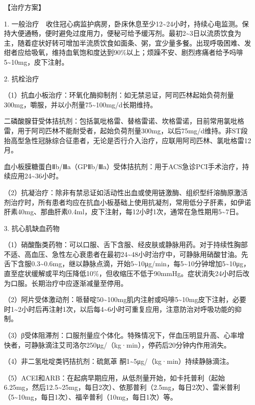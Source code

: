 【治疗方案】

1.
一般治疗　收住冠心病监护病房，卧床休息至少12\textasciitilde{}24小时，持续心电监测。保持大便通畅，便时避免过度用力，便秘可给予缓泻剂。最初2\textasciitilde{}3日以流质饮食为主，随着症状好转可增加半流质饮食如面条、粥，宜少量多餐。出现呼吸困难、发绀者应给吸氧，维持血氧饱和度达到90\%以上；烦躁不安、剧烈疼痛者给予吗啡5\textasciitilde{}10mg，皮下注射。

2. 抗栓治疗

（1）抗血小板治疗：环氧化酶抑制剂：如无禁忌证，阿司匹林起始负荷剂量300mg，嚼服，并以小剂量75\textasciitilde{}100mg/d长期维持。

二磷酸腺苷受体拮抗剂：包括氯吡格雷、替格雷诺、坎格雷诺，目前常用氯吡格雷，用于阿司匹林不能耐受者，起始负荷剂量300mg，以后75mg/d维持。非ST段抬高型急性冠脉综合征患者，无论是否行介入治疗，应联用阿司匹林、氯吡格雷12月。

血小板膜糖蛋白Ⅱb/Ⅲa（GPⅡb/Ⅲa）受体拮抗剂：用于ACS急诊PCI手术治疗，持续应用24\textasciitilde{}36小时。

（2）抗凝治疗：除非有禁忌证如活动性出血或使用链激酶、组织型纤溶酶原激活剂治疗时，所有患者均应在抗血小板基础上使用抗凝剂，常用低分子肝素，如伊诺肝素40mg、那曲肝素0.4ml，皮下注射，每12小时1次，通常在急性期用5\textasciitilde{}7日。

3. 抗心肌缺血药物

（1）硝酸酯类药物：可以口服、舌下含服、经皮肤或静脉用药。对于持续性胸部不适、高血压、急性左心衰患者在最初24\textasciitilde{}48小时治疗中，可静脉用硝酸甘油。先舌下含服0.3\textasciitilde{}0.6mg，继以静脉点滴，开始5\textasciitilde{}10μg/min，每5\textasciitilde{}10分钟增加5\textasciitilde{}10μg，直至症状缓解或平均压降低10\%，但收缩压不低于90mmHg。症状消失24小时后改为口服。长期治疗中应逐渐减量至停用。

（2）阿片受体激动剂：哌替啶50\textasciitilde{}100mg肌内注射或吗啡5\textasciitilde{}10mg皮下注射，必要时1\textasciitilde{}2小时后再注射1次，以后每4\textasciitilde{}6小时可重复应用，注意防治对呼吸功能的抑制。

（3）β受体阻滞剂：口服剂量应个体化。特殊情况下，伴血压明显升高、心率增快者，可静脉滴注艾司洛尔250μg/（kg·min），停药后20分钟内作用消失。

（4）非二氢吡啶类钙拮抗剂：硫氮䓬
酮1\textasciitilde{}5μg/（kg·min）持续静脉滴注。

（5）ACEI和ARB：在起病早期应用，从低剂量开始，如卡托普利（起始6.25mg，然后12.5\textasciitilde{}25mg，每日2次）、依那普利（2.5mg，每日2次）、雷米普利（5\textasciitilde{}10mg，每日1次）、福辛普利（10mg，每日1次）等。

